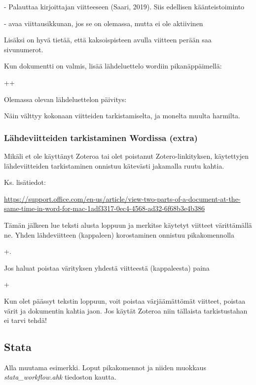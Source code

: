 \documentclass[a4paper,12pt]{scrartcl}
\begin{document}
- Palauttaa kirjoittajan viitteeseen (Saari, 2019). Siis edellisen käänteistoiminto

- avaa viittausikkunan, jos se on olemassa, mutta ei ole aktiivinen


Lisäksi on hyvä tietää, että kaksoispisteen \keys{:} avulla viitteen perään saa sivunumerot.

Kun dokumentti on valmis, lisää lähdeluettelo wordiin pikanäppäimellä:

\keys{\ctrl}++

Olemassa olevan lähdeluettelon päivitys:


Näin välttyy kokonaan viitteiden tarkistamiselta, ja monelta muulta harmilta.

\subsubsection{Lähdeviitteiden tarkistaminen Wordissa (extra)}
Mikäli et ole käyttänyt Zoteroa tai olet poistanut Zotero-linkityksen, käytettyjen lähdeviitteiden tarkistaminen onnistuu kätevästi jakamalla ruutu kahtia.



Ks. lisätiedot:

\url{https://support.office.com/en-us/article/view-two-parts-of-a-document-at-the-same-time-in-word-for-mac-1adf3317-0ec4-4568-ad32-6f68b3e4b386}

Tämän jälkeen lue teksti alusta loppuun ja merkitse käytetyt viitteet värittämällä ne. Yhden lähdeviitteen (kappaleen) korostaminen onnistuu pikakomennolla

+. 

Jos haluat poistaa värityksen yhdestä viitteestä (kappaleesta) paina

+

Kun olet päässyt tekstin loppuun, voit poistaa värjäämättömät viitteet, poistaa värit ja dokumentin kahtia jaon. Jos käytät Zoteroa niin tällaista tarkistustahan ei tarvi tehdä!

\subsection{Stata}

Alla muutama esimerkki. Loput pikakomennot ja niiden muokkaus \emph{stata\_workflow.ahk} tiedoston kautta.
\end{document}
